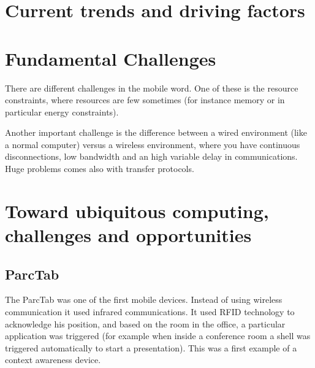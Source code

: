 \section{Current trends and driving factors}

\section{Fundamental Challenges}

There are different challenges in the mobile word.
One of these is the resource constraints, where resources are few sometimes 
(for instance memory or in particular energy constraints).

Another important challenge is the difference between a wired environment (like 
a normal computer) versus a wireless environment, where you have continuous 
disconnections, low bandwidth and an high variable delay in communications. 
Huge problems comes also with transfer protocols.

\section{Toward ubiquitous computing, challenges and opportunities}

\subsection{ParcTab}

The ParcTab was one of the first mobile devices. Instead of using wireless 
communication it used infrared communications. It used RFID technology to 
acknowledge his position, and based on the room in the office, a particular 
application was triggered (for example when inside a conference room a shell 
was triggered automatically to start a presentation). This was a first example 
of a context awareness device.